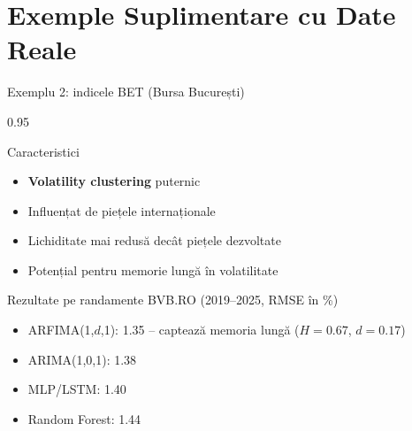 \documentclass[9pt, aspectratio=169, t]{beamer}
\begin{document}
\section{Exemple Suplimentare cu Date Reale}

\begin{frame}{Exemplu 2: indicele BET (Bursa București)}
    \begin{cminipage}{0.95\textwidth}
        \begin{block}{Caracteristici}
            \begin{itemize}\setlength{\itemsep}{0pt}
                \item \textbf{Volatility clustering} puternic
                \item Influențat de piețele internaționale
                \item Lichiditate mai redusă decât piețele dezvoltate
                \item Potențial pentru memorie lungă în volatilitate
            \end{itemize}
        \end{block}

        \vspace{0.2cm}

        \begin{exampleblock}{Rezultate pe randamente BVB.RO (2019--2025, RMSE în \%)}
            \begin{itemize}\setlength{\itemsep}{0pt}
                \item ARFIMA(1,$d$,1): 1.35 -- captează memoria lungă ($H = 0.67$, $d = 0.17$)
                \item ARIMA(1,0,1): 1.38
                \item MLP/LSTM: 1.40
                \item Random Forest: 1.44
            \end{itemize}
        \end{exampleblock}
    \end{cminipage}
\end{frame}
\end{document}
